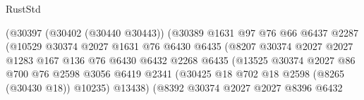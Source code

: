 \begin{lexlean}{RustStd}
\begin{coremodule}
                                    (@30397
                                      (@30402 (@30440 @30443))
                                      (@30389
                                        @1631
                                        @97
                                        @76
                                        @66
                                        @6437
                                        @2287
                                        (@10529
                                          @30374
                                          @2027
                                          @1631
                                          @76
                                          @6430
                                          @6435
                                          (@8207
                                            @30374
                                            @2027
                                            @2027
                                            @1283
                                            @167
                                            @136
                                            @76
                                            @6430
                                            @6432
                                            @2268
                                            @6435
                                            (@13525
                                              @30374
                                              @2027
                                              @86
                                              @700
                                              @76
                                              @2598
                                              @3056
                                              @6419
                                              @2341
                                              (@30425
                                                @18
                                                @702
                                                @18
                                                @2598
                                                (@8265 (@30430 @18))
                                                @10235)
                                              @13438)
                                            (@8392
                                              @30374
                                              @2027
                                              @2027
                                              @8396
                                              @6432

\end{coremodule}
\end{lexlean}

